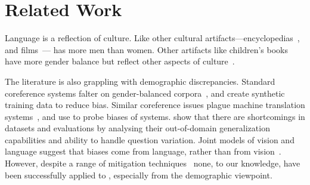 
\section{Related Work}
\label{sec:related}

Language is a reflection of culture.
Like other cultural artifacts---encyclopedias~\cite{reagle-11}, and films~\cite{sap-etal-2017-connotation}--- has more men than women.
Other artifacts like children's books have more gender balance but reflect other aspects of culture~\cite{larrick-65}.

The  literature is also grappling with demographic discrepancies.
Standard coreference systems falter on gender-balanced corpora~\cite{webster-18}, and \citet{zhao-18} create synthetic training data to reduce bias.
Similar coreference issues plague machine translation systems~\cite{stanovsky-19}, and \citet{li-20} use  to probe biases of  systems.
\citet{Sen_2020} show that there are shortcomings in \qa{} datasets and evaluations by analysing their out-of-domain generalization capabilities and ability to handle question variation.
Joint models of vision and language suggest that biases come from language, rather than from  vision~\cite{ross-etal-2021-measuring}.
However, despite a range of mitigation techniques~\citep[inter alia]{zhao-17} none, to our knowledge, have been successfully applied to , especially from the demographic viewpoint.

